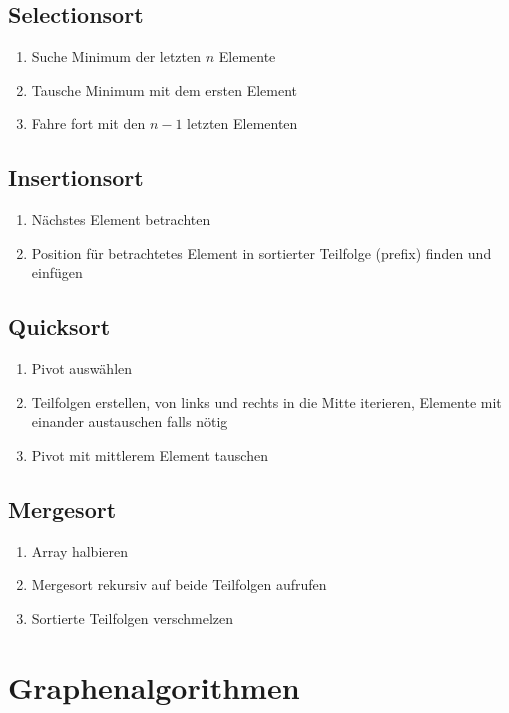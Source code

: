 \documentclass[11pt]{article}
\begin{document}
\subsection{Selectionsort}

\begin{enumerate}[noitemsep]
	\item Suche Minimum der letzten $n$ Elemente
	\item Tausche Minimum mit dem ersten Element
	\item Fahre fort mit den $n-1$ letzten Elementen
\end{enumerate}

\subsection{Insertionsort}

\begin{enumerate}[noitemsep]
	\item Nächstes Element betrachten
	\item Position für betrachtetes Element in sortierter Teilfolge (prefix) finden und einfügen
\end{enumerate}

\subsection{Quicksort}

\begin{enumerate}[noitemsep]
	\item Pivot auswählen
	\item Teilfolgen erstellen, von links und rechts in die Mitte iterieren, Elemente mit einander austauschen falls nötig
	\item Pivot mit mittlerem Element tauschen
\end{enumerate}

\subsection{Mergesort}

\begin{enumerate}[noitemsep]
	\item Array halbieren
	\item Mergesort rekursiv auf beide Teilfolgen aufrufen
	\item Sortierte Teilfolgen verschmelzen	
\end{enumerate}

\section{Graphenalgorithmen}
\end{document}
